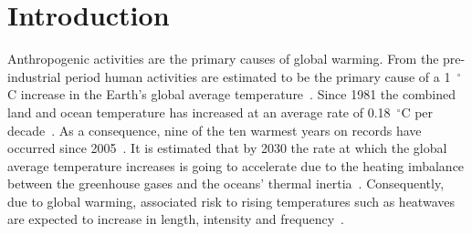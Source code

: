 

%

\section{Introduction}\label{sec:introduction}

Anthropogenic activities are the primary causes of global warming.
From the pre-industrial period human activities are estimated to be the primary cause of a 1~$^{\circ}$C increase in the Earth's global average temperature~\cite{GlobalWa91:online}.
Since 1981 the combined land and ocean temperature has increased at an average rate of 0.18~$^{\circ}$C per decade~\cite{GlobalCl28:online}.
As a consequence, nine of the ten warmest years on records have occurred since 2005~\cite{ClimateC26:online}.
It is estimated that by 2030 the rate at which the global average temperature increases is going to accelerate due to the heating imbalance between the greenhouse gases and the oceans' thermal inertia~\cite{ClimateC26:online}.
Consequently, due to global warming, associated risk to rising temperatures such as heatwaves are expected to increase in length, intensity and frequency~\cite{Whatharm75:online}.

